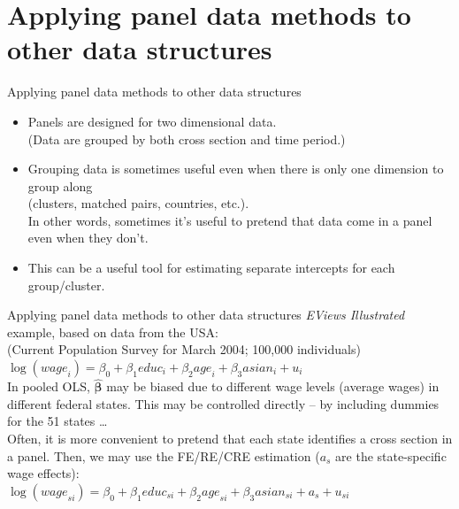 \documentclass[usenames,dvipsnames]{beamer}
\begin{document}
\section{Applying panel data methods to other data structures}
\begin{frame}{Applying panel data methods to other data structures}
\begin{itemize}
\item Panels are designed for two dimensional data.\\
(Data are grouped by both cross section and time period.) \\
\medskip
\item Grouping data is sometimes useful even when there is only one dimension to group along \\(clusters, matched pairs, countries, etc.). \\
\medskip
In other words, sometimes it’s useful to pretend that data come in a panel even when they don’t. \\
\medskip
\item This can be a useful tool for estimating separate intercepts for each group/cluster.
\end{itemize}
\end{frame}
\begin{frame}{Applying panel data methods to other data structures}
\textit{EViews Illustrated} example, based on data from the USA:\\
\small (Current Population Survey for March 2004; 100,000 individuals)\\
\vspace{0.5cm}
$\log(\textit{wage}_i) = \beta_0 + \beta_1 \textit{educ}_i + \beta_2 \textit{age}_i + \beta_3 \textit{asian}_i + u_i$\\
\vspace{0.5cm}
In pooled OLS, $\hat{\bm{\beta}}$ may be biased due to different wage levels (average wages) in different federal states. This may be controlled directly – by including dummies for the 51 states \dots \\
\vspace{0.5cm}
Often, it is more convenient to pretend that each state identifies a cross section in a panel. Then, we may use the FE/RE/CRE estimation ($a_s$ are the state-specific wage effects):\\
\vspace{0.5cm}
$\log(\textit{wage}_{si}) = \beta_0 + \beta_1 \textit{educ}_{si} + \beta_2 \textit{age}_{si} + \beta_3 \textit{asian}_{si} + a_s + u_{si}$
\end{frame}
\end{document}
